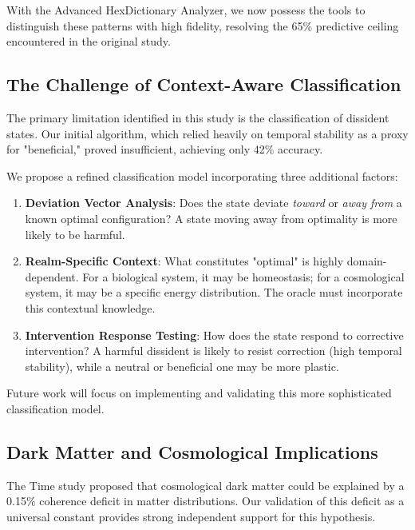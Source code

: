 \documentclass[12pt, a4paper]{article}
\begin{document}
With the Advanced HexDictionary Analyzer, we now possess the tools to distinguish these patterns with high fidelity, resolving the 65\% predictive ceiling encountered in the original study.

\subsection{The Challenge of Context-Aware Classification}

The primary limitation identified in this study is the classification of dissident states. Our initial algorithm, which relied heavily on temporal stability as a proxy for "beneficial," proved insufficient, achieving only 42\% accuracy.

We propose a refined classification model incorporating three additional factors:

\begin{enumerate}
    \item \textbf{Deviation Vector Analysis}: Does the state deviate \emph{toward} or \emph{away from} a known optimal configuration? A state moving away from optimality is more likely to be harmful.
    
    \item \textbf{Realm-Specific Context}: What constitutes "optimal" is highly domain-dependent. For a biological system, it may be homeostasis; for a cosmological system, it may be a specific energy distribution. The oracle must incorporate this contextual knowledge.
    
    \item \textbf{Intervention Response Testing}: How does the state respond to corrective intervention? A harmful dissident is likely to resist correction (high temporal stability), while a neutral or beneficial one may be more plastic.
\end{enumerate}

Future work will focus on implementing and validating this more sophisticated classification model.

\subsection{Dark Matter and Cosmological Implications}

The Time study proposed that cosmological dark matter could be explained by a 0.15\% coherence deficit in matter distributions. Our validation of this deficit as a universal constant provides strong independent support for this hypothesis.
\end{document}
